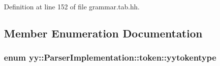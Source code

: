 Definition at line 152 of file grammar.tab.hh.



\subsection{Member Enumeration Documentation}
\hypertarget{structyy_1_1_parser_implementation_1_1token_aadf9ae7281b1272b27ee431a11ede892}{
\subsubsection[{yytokentype}]{\setlength{\rightskip}{0pt plus 5cm}enum {\bf yy::ParserImplementation::token::yytokentype}}}
\label{structyy_1_1_parser_implementation_1_1token_aadf9ae7281b1272b27ee431a11ede892}
